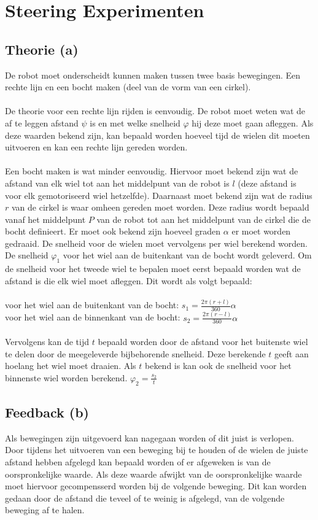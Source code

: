 \documentclass[a4paper]{article}
\begin{document}
\section{Steering Experimenten}

\subsection{Theorie (a)}
De robot moet onderscheidt kunnen maken tussen twee basis bewegingen. Een rechte lijn en een bocht maken (deel van de vorm van een cirkel).\\
\\
De theorie voor een rechte lijn rijden is eenvoudig. De robot moet weten wat de af te leggen afstand $\psi$ is en met welke snelheid $\varphi$ hij deze moet gaan afleggen. Als deze waarden bekend zijn, kan bepaald worden hoeveel tijd de wielen dit moeten uitvoeren en kan een rechte lijn gereden worden.\\
\\
Een bocht maken is wat minder eenvoudig. Hiervoor moet bekend zijn wat de afstand van elk wiel tot aan het middelpunt van de robot is $l$ (deze afstand is voor elk gemotoriseerd wiel hetzelfde). Daarnaast moet bekend zijn wat de radius $r$ van de cirkel is waar omheen gereden moet worden. Deze radius wordt bepaald vanaf het middelpunt $P$ van de robot tot aan het middelpunt van de cirkel die de bocht definieert. Er moet ook bekend zijn hoeveel graden $\alpha$ er moet worden gedraaid. De snelheid voor de wielen moet vervolgens per wiel berekend worden. De snelheid $\varphi_1$ voor het wiel aan de buitenkant van de bocht wordt geleverd. Om de snelheid voor het tweede wiel te bepalen moet eerst bepaald worden wat de afstand is die elk wiel moet afleggen. Dit wordt als volgt bepaald:\\\\
voor het wiel aan de buitenkant van de bocht:
$s_1 = \frac{2\pi(r + l)}{360}\alpha$\\
voor het wiel aan de binnenkant van de bocht:
$s_2 = \frac{2\pi(r - l)}{360}\alpha$\\\\
Vervolgens kan de tijd $t$ bepaald worden door de afstand voor het buitenste wiel te delen door de meegeleverde bijbehorende snelheid. Deze berekende $t$ geeft aan hoelang het wiel moet draaien. Als $t$ bekend is kan ook de snelheid voor het binnenste wiel worden berekend. $\varphi_2=\frac{s_2}{t}$

\subsection{Feedback  (b)}
Als bewegingen zijn uitgevoerd kan nagegaan worden of dit juist is verlopen. Door tijdens het uitvoeren van een beweging bij te houden of de wielen de juiste afstand hebben afgelegd kan bepaald worden of er afgeweken is van de oorspronkelijke waarde. Als deze waarde afwijkt van de oorspronkelijke waarde moet hiervoor gecompensserd worden bij de volgende beweging. Dit kan worden gedaan door de afstand die teveel of te weinig is afgelegd, van de volgende beweging af te halen.
\end{document}
